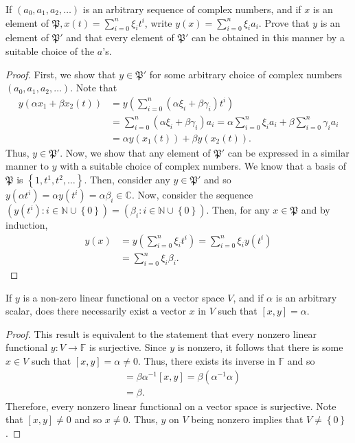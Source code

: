 \documentclass[12pt]{article}
\newcommand{\N}{\mathbb{N}}
\newenvironment{problem}[2][Problem]{\begin{trivlist} \item[\hskip \labelsep {\bfseries #1}\hskip \labelsep {\bfseries #2.}]}{\end{trivlist}}
\begin{document}
\begin{problem}{4}
  If $(a_{0},a_{1},a_{2},\dots)$ is an arbitrary sequence of complex numbers, and if $x$ is an element of $\mathfrak{P}, x(t)=\sum_{i=0}^{n}\xi_{i}t^{i}$, write $y(x) = \sum_{i=0}^{n}\xi_{i}a_{i}$. Prove that $y$ is an element of $\mathfrak{P}'$ and that every element of $\mathfrak{P}'$ can be obtained in this manner by a suitable choice of the $a$'s.
\begin{proof}
  First, we show that $y\in \mathfrak{P}'$ for some arbitrary choice of complex numbers $(a_{0},a_{1},a_{2},\dots)$. Note that
\begin{align*}
  y(\alpha x_{1} + \beta x_{2} (t)) &= y\left( \sum_{i=0}^{n}(\alpha \xi_{i} + \beta \gamma_{i})t^{i}\right) \\
  &= \sum_{i=0}^{n} (\alpha\xi_{i}+\beta\gamma_{i})a_{i} = \alpha \sum_{i=0}^{n} \xi_{i}a_{i} + \beta \sum_{i=0}^{n} \gamma_{i}a_{i}\\
  &= \alpha y(x_{1}(t)) + \beta y(x_{2}(t)).
\end{align*}
Thus, $y\in \mathfrak{P}'$. Now, we show that any element of $\mathfrak{P}'$ can be expressed in a similar manner to $y$ with a suitable choice of complex numbers. We know that a basis of $\mathfrak{P}$ is $\left\{ 1,t^{1},t^{2},\dots \right\}$. Then, consider any $y\in \mathfrak{P}'$ and so $y (\alpha t^{i} ) = \alpha y(t^{i}) = \alpha \beta_{i} \in \mathbb{C}$. Now, consider the sequence $\left( y(t^{i}): i\in \N\cup\left\{ 0 \right\}\right) = \left( \beta_{i}:i\in\N\cup\left\{ 0 \right\} \right)$. Then, for any $x\in \mathfrak{P}$ and by induction, 
\begin{align*}
  y(x) &= y(\sum_{i=0}^{n}\xi_{i}t^{i}) = \sum_{i=0}^{n}\xi_{i} y(t^{i})\\
  &= \sum_{i=0}^{n}\xi_{i} \beta_{i}.
\end{align*}
\end{proof}
\end{problem}
\begin{problem}{5}
  If $y$ is a non-zero linear functional on a vector space $V$, and if $\alpha$ is an arbitrary scalar, does there necessarily exist a vector $x$ in $V$ such that $[x,y] = \alpha$.
\begin{proof}
  This result is equivalent to the statement that every nonzero linear functional $y:V\to \mathbb{F}$ is surjective. Since $y$ is nonzero, it follows that there is some $x\in V$ such that $[x,y] = \alpha \neq 0$. Thus, there exists its inverse in $\mathbb{F}$ and so 
\begin{align*}
  [\beta(\alpha^{-1}x), y] &=  \beta\alpha^{-1}[x,y] = \beta(\alpha^{-1}\alpha)\\
  &= \beta.
\end{align*}
Therefore, every nonzero linear functional on a vector space is surjective. Note that $[x,y] \neq 0$ and so $x\neq 0$. Thus, $y$ on $V$ being nonzero implies that $V\neq \left\{ 0 \right\}$.
\end{proof}
\end{problem}
\end{document}
